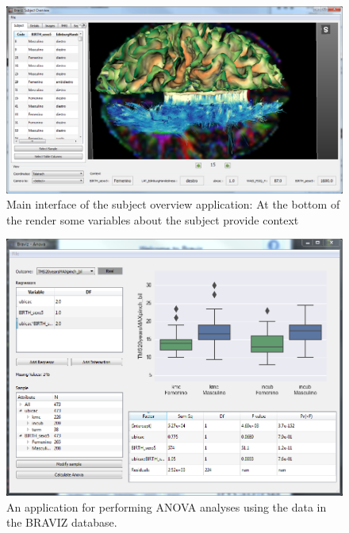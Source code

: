 \documentclass[twocolumn]{svjour3}
\begin{document}
\begin{figure}
\begin{center}
\includegraphics[width=\linewidth]{subj_overview_full}
\end{center}
 \caption{\label{fig_subject}Main interface of the subject overview application: At the bottom of the render some variables about the subject provide context}
\end{figure}

\begin{figure}
\begin{center}
\includegraphics[width=\linewidth]{anova.png}
\end{center}
 \caption{\label{fig_anova}An application for performing ANOVA analyses using the data in the BRAVIZ database.}
\end{figure}
\end{document}
